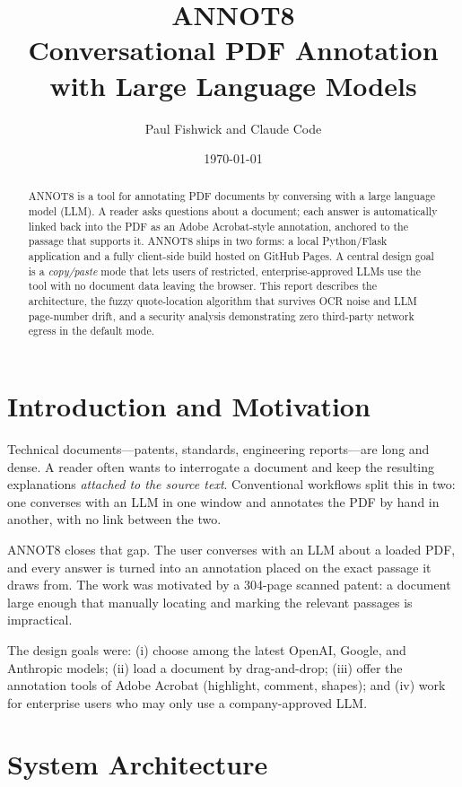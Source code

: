 \documentclass[11pt]{article}
\title{\textbf{ANNOT8}\\[2pt]
\large Conversational PDF Annotation with Large Language Models}
\author{Paul Fishwick and Claude Code}
\date{\today}
\begin{document}
\maketitle

\begin{abstract}
\noindent
ANNOT8 is a tool for annotating PDF documents by conversing with a large
language model (LLM). A reader asks questions about a document; each answer is
automatically linked back into the PDF as an Adobe Acrobat-style annotation,
anchored to the passage that supports it. ANNOT8 ships in two forms: a local
Python/Flask application and a fully client-side build hosted on GitHub Pages.
A central design goal is a \emph{copy/paste} mode that lets users of
restricted, enterprise-approved LLMs use the tool with no document data leaving
the browser. This report describes the architecture, the fuzzy quote-location
algorithm that survives OCR noise and LLM page-number drift, and a security
analysis demonstrating zero third-party network egress in the default mode.
\end{abstract}

\section{Introduction and Motivation}

Technical documents---patents, standards, engineering reports---are long and
dense. A reader often wants to interrogate a document and keep the resulting
explanations \emph{attached to the source text}. Conventional workflows split
this in two: one converses with an LLM in one window and annotates the PDF by
hand in another, with no link between the two.

ANNOT8 closes that gap. The user converses with an LLM about a loaded PDF, and
every answer is turned into an annotation placed on the exact passage it draws
from. The work was motivated by a 304-page scanned patent: a document large
enough that manually locating and marking the relevant passages is impractical.

The design goals were: (i) choose among the latest OpenAI, Google, and
Anthropic models; (ii) load a document by drag-and-drop; (iii) offer the
annotation tools of Adobe Acrobat (highlight, comment, shapes); and (iv) work
for enterprise users who may only use a company-approved LLM.

\section{System Architecture}
\end{document}
